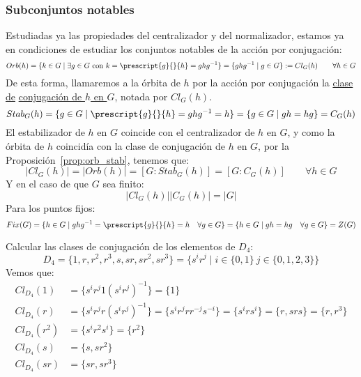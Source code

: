 \subsubsection{Subconjuntos notables}
\noindent
Estudiadas ya las propiedades del centralizador y del normalizador, estamos ya en condiciones de estudiar los conjuntos notables de la acción por conjugación:
\begin{equation*}
    Orb(h) = \{k\in G \mid \exists g\in G \text{\ con\ } k = \prescript{g}{}{h} = ghg^{-1}\} = \{ghg^{-1}\mid g\in G\} := Cl_G(h) \qquad \forall h\in G
\end{equation*}
De esta forma, llamaremos a la órbita de $h$ por la acción por conjugación la \underline{clase de} \underline{conjugación de $h$ en $G$}, notada por $Cl_G(h)$.
\begin{equation*}
    Stab_G(h) = \{g\in G \mid \prescript{g}{}{h} = ghg^{-1} = h\} = \{g \in G \mid gh = hg\} = C_G(h)
\end{equation*}
El estabilizador de $h$ en $G$ coincide con el centralizador de $h$ en $G$, y como la órbita de $h$ coincidía con la clase de conjugación de $h$ en $G$, por la Proposición~\ref{prop:orb_stab}, tenemos que:
\begin{equation*}
    |Cl_G(h)| = |Orb(h)| = [G:Stab_G(h)] = [G:C_G(h)] \qquad \forall h\in G
\end{equation*}
Y en el caso de que $G$ sea finito:
\begin{equation*}
    |Cl_G(h)| |C_G(h)| = |G|
\end{equation*}
Para los puntos fijos:
\begin{equation*}
    Fix(G) = \{h\in G \mid ghg^{-1} = \prescript{g}{}{h} = h \quad \forall g\in G\} = \{h\in G\mid gh = hg \quad \forall g\in G\} = Z(G)
\end{equation*}

\begin{ejemplo}
    Calcular las clases de conjugación de los elementos de $D_4$:
    \begin{equation*}
        D_4 = \{1,r,r^2, r^3, s, sr, sr^2, sr^3\} = \{s^i r^j \mid i \in \{0,1\}\ j \in \{0,1,2,3\}\}
    \end{equation*}
    Vemos que:
    \begin{align*}
        Cl_{D_4}(1) &= \{s^ir^j 1 {(s^i r^j)}^{-1}\} = \{1\} \\
        Cl_{D_4}(r) &= \{s^ir^j r {(s^i r^j)}^{-1}\} = \{s^i r^j rr^{-j}s^{-i}\} = \{s^i r s^{i}\} = \{r, srs\} = \{r,r^3\} \\ %
        Cl_{D_4}(r^2) &= \{s^i r^2 s^i\} = \{r^2\} \\
        Cl_{D_4}(s) &= \{s,sr^2\} \\
        Cl_{D_4}(sr) &= \{sr,sr^3\} 
    \end{align*}
\end{ejemplo}

